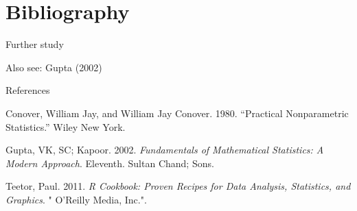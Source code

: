 \documentclass[ignorenonframetext,aspectratio=169]{beamer}
\begin{document}
\hypertarget{bibliography}{%
\section{Bibliography}\label{bibliography}}

\begin{frame}{Further study}
\protect\hypertarget{further-study}{}

Also see: Gupta (2002)

\end{frame}

\begin{frame}{References}
\protect\hypertarget{references}{}

\hypertarget{refs}{}
\leavevmode\hypertarget{ref-conover1980practical}{}%
Conover, William Jay, and William Jay Conover. 1980. ``Practical
Nonparametric Statistics.'' Wiley New York.

\leavevmode\hypertarget{ref-gupta2002fundamentals}{}%
Gupta, VK, SC; Kapoor. 2002. \emph{Fundamentals of Mathematical
Statistics: A Modern Approach}. Eleventh. Sultan Chand; Sons.

\leavevmode\hypertarget{ref-teetor2011r}{}%
Teetor, Paul. 2011. \emph{R Cookbook: Proven Recipes for Data Analysis,
Statistics, and Graphics}. " O'Reilly Media, Inc.".

\end{frame}
\end{document}
